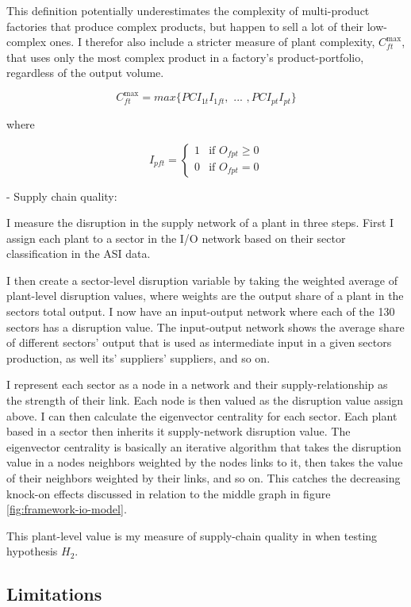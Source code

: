 \documentclass[11pt]{article}
\begin{document}
This definition potentially underestimates the complexity of multi-product factories that produce complex products, but happen to sell a lot of their low-complex ones. I therefor also include a stricter measure of plant complexity, \(C^{\text{max}}_{ft}\), that uses only the most complex product in a factory's product-portfolio, regardless of the output volume.

$$
C^{\text{max}}_{ft} = max \{ PCI_{1t} I_{1ft}, \text{ ... }, PCI_{pt} I_{pt} \}
$$

where

\[
I_{pft} = \begin{cases}
 1 & \text{if } O_{fpt} \geq 0 \\
 0 & \text{if } O_{fpt} = 0
\end{cases}
\]

- Supply chain quality:

I measure the disruption in the supply network of a plant in three steps. First I assign each plant to a sector in the I/O network based on their sector classification in the ASI data.

I then create a sector-level disruption variable by taking the weighted average of plant-level disruption values, where weights are the output share of a plant in the sectors total output. I now have an input-output network where each of the 130 sectors has a disruption value. The input-output network shows the average share of different sectors' output that is used as intermediate input in a given sectors production, as well its' suppliers' suppliers, and so on.

I represent each sector as a node in a network and their supply-relationship as the strength of their link. Each node is then valued as the disruption value assign above. I can then calculate the eigenvector centrality for each sector. Each plant based in a sector then inherits it supply-network disruption value. The eigenvector centrality is basically an iterative algorithm that takes the disruption value in a nodes neighbors weighted by the nodes links to it, then takes the value of their neighbors weighted by their links, and so on. This catches the decreasing knock-on effects discussed in relation to the middle graph in figure \ref{fig:framework-io-model}.

This plant-level value is my measure of supply-chain quality in when testing hypothesis \(H_2\).

\subsection{Limitations}
\label{sec:org979560b}
\end{document}
